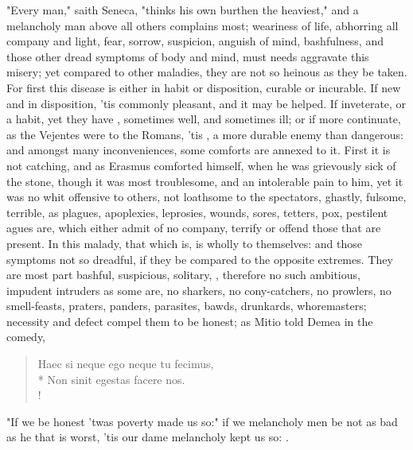 {"Every man," saith Seneca, "thinks his own burthen the heaviest," and a melancholy man above all others complains most; weariness of life, abhorring all company and light, fear, sorrow, suspicion, anguish of mind, bashfulness, and those other dread symptoms of body and mind, must needs aggravate this misery; yet compared to other maladies, they are not so heinous as they be taken. For first this disease is either in habit or disposition, curable or incurable. If new and in disposition, 'tis commonly pleasant, and it may be helped. If inveterate, or a habit, yet they have , sometimes well, and sometimes ill; or if more continuate, as the Vejentes were to the Romans, 'tis , a more durable enemy than dangerous: and amongst many inconveniences, some comforts are annexed to it. First it is not catching, and as Erasmus comforted himself, when he was grievously sick of the stone, though it was most troublesome, and an intolerable pain to him, yet it was no whit offensive to others, not loathsome to the spectators, ghastly, fulsome, terrible, as plagues, apoplexies, leprosies, wounds, sores, tetters, pox, pestilent agues are, which either admit of no company, terrify or offend those that are present. In this malady, that which is, is wholly to themselves: and those symptoms not so dreadful, if they be compared to the opposite extremes. They are most part bashful, suspicious, solitary, \etc{}, therefore no such ambitious, impudent intruders as some are, no sharkers, no cony-catchers, no prowlers, no smell-feasts, praters, panders, parasites, bawds, drunkards, whoremasters; necessity and defect compel them to be honest; as Mitio told Demea in the comedy,

\begin{latin}%
\begin{verse}%
Haec si neque ego neque tu fecimus,\\*
Non sinit egestas facere nos.\\!
\end{verse}%
\end{latin}%

"If we be honest 'twas poverty made us so:" if we melancholy men be not as bad as he that is worst, 'tis our dame melancholy kept us so: . 

}
